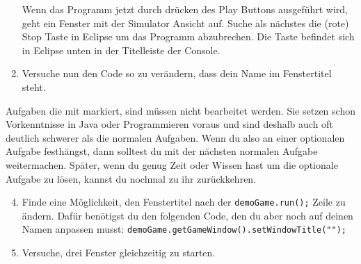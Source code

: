 \begin{enumerate}
    Wenn das Programm jetzt durch drücken des Play Buttons ausgeführt wird, geht ein Fenster mit der Simulator Ansicht auf.
    Suche als nächstes die (rote) Stop Taste in Eclipse um das Programm abzubrechen.
    Die Taste befindet sich in Eclipse unten in der Titelleiste der Console.
    \item Versuche nun den Code so zu verändern, dass dein Name im Fenstertitel steht.
\end{enumerate}


\begin{Infobox}
    Aufgaben die mit \optional markiert, sind müssen nicht bearbeitet werden.
    Sie setzen schon Vorkenntnisse in Java oder Programmieren voraus und sind deshalb auch oft deutlich schwerer als die normalen Aufgaben.
    Wenn du also an einer optionalen Aufgabe festhängst, dann solltest du mit der nächsten normalen Aufgabe weitermachen.
    Später, wenn du genug Zeit oder Wissen hast um die optionale Aufgabe zu lösen, kannst du nochmal zu ihr zurückkehren.
\end{Infobox}


\begin{enumerate} \setcounter{enumi}{3}
\item \optional Finde eine Möglichkeit, den Fenstertitel nach der \lstinline{demoGame.run();} Zeile zu ändern.
Dafür benötigst du den folgenden Code, den du aber noch auf deinen Namen anpassen musst: \lstinline{demoGame.getGameWindow().setWindowTitle("");}
\item \optional Versuche, drei Fenster gleichzeitig zu starten.
\end{enumerate}

